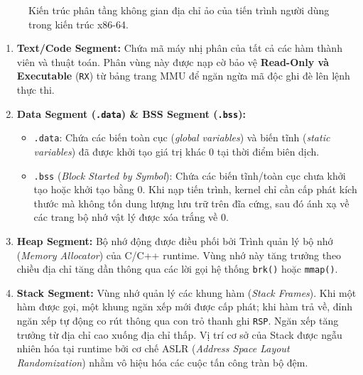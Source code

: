 \documentclass[12pt,a4paper,oneside]{book}
\begin{document}
\begin{figure}[htbp]
{%
}
\caption{Kiến trúc phân tầng không gian địa chỉ ảo của tiến trình người dùng trong kiến trúc x86-64.}
\end{figure}

\begin{underhoodbox}
\begin{enumerate}
    \item \textbf{Text/Code Segment:} Chứa mã máy nhị phân của tất cả các hàm thành viên và thuật toán. Phân vùng này được nạp cờ bảo vệ \textbf{Read-Only và Executable} (\texttt{RX}) từ bảng trang MMU để ngăn ngừa mã độc ghi đè lên lệnh thực thi.
    \item \textbf{Data Segment (\texttt{.data}) \& BSS Segment (\texttt{.bss}):}
    \begin{itemize}
        \item \texttt{.data}: Chứa các biến toàn cục (\textit{global variables}) và biến tĩnh (\textit{static variables}) đã được khởi tạo giá trị khác 0 tại thời điểm biên dịch.
        \item \texttt{.bss} (\textit{Block Started by Symbol}): Chứa các biến tĩnh/toàn cục chưa khởi tạo hoặc khởi tạo bằng 0. Khi nạp tiến trình, kernel chỉ cần cấp phát kích thước mà không tốn dung lượng lưu trữ trên đĩa cứng, sau đó ánh xạ về các trang bộ nhớ vật lý được xóa trắng về 0.
    \end{itemize}
    \item \textbf{Heap Segment:} Bộ nhớ động được điều phối bởi Trình quản lý bộ nhớ (\textit{Memory Allocator}) của C/C++ runtime. Vùng nhớ này tăng trưởng theo chiều địa chỉ tăng dần thông qua các lời gọi hệ thống \texttt{brk()} hoặc \texttt{mmap()}.
    \item \textbf{Stack Segment:} Vùng nhớ quản lý các khung hàm (\textit{Stack Frames}). Khi một hàm được gọi, một khung ngăn xếp mới được cấp phát; khi hàm trả về, đỉnh ngăn xếp tự động co rút thông qua con trỏ thanh ghi \texttt{RSP}. Ngăn xếp tăng trưởng từ địa chỉ cao xuống địa chỉ thấp. Vị trí cơ sở của Stack được ngẫu nhiên hóa tại runtime bởi cơ chế ASLR (\textit{Address Space Layout Randomization}) nhằm vô hiệu hóa các cuộc tấn công tràn bộ đệm.
\end{enumerate}
\end{underhoodbox}
\end{document}
